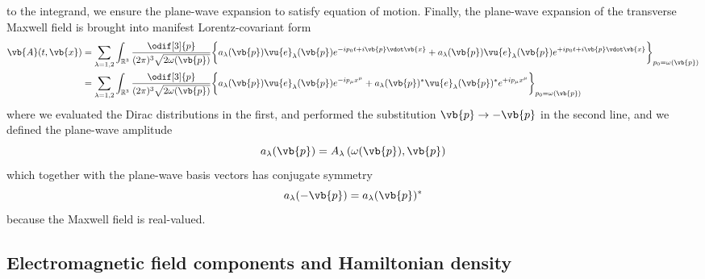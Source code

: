 to the integrand, we ensure the plane-wave expansion to satisfy equation of motion.
Finally, the plane-wave expansion of the transverse Maxwell field is brought into manifest Lorentz-covariant form
\begin{equation}
	\begin{split}
		\vb{A}(t,\vb{x})
		&=
		\sum_{\lambda=1,2}
		\int_{\mathbb{R}^3}\frac{\odif[3]{p}}{(2\pi)^3\sqrt{2\omega(\vb{p})}}
		\biggl\{
			a_\lambda(\vb{p})
			\vu{e}_\lambda(\vb{p})
			e^{-ip_0t+i\vb{p}\vdot\vb{x}}
			+
			a_\lambda(\vb{p})
			\vu{e}_\lambda(\vb{p})
			e^{+ip_0t+i\vb{p}\vdot\vb{x}}
		\biggr\}_{p_0=\omega(\vb{p})}
		\\
		&=
		\sum_{\lambda=1,2}
		\int_{\mathbb{R}^3}\frac{\odif[3]{p}}{(2\pi)^3\sqrt{2\omega(\vb{p})}}
		\biggl\{
			a_\lambda(\vb{p})
			\vu{e}_\lambda(\vb{p})
			e^{-ip_\mu x^\mu}
			+
			a_\lambda(\vb{p})^*
			\vu{e}_\lambda(\vb{p})^*
			e^{+ip_\mu x^\mu}
		\biggr\}_{p_0=\omega(\vb{p})}
	\end{split}
\end{equation}
where we evaluated the Dirac distributions in the first, and performed the substitution $\vb{p}\to-\vb{p}$ in the second line, and we defined the plane-wave amplitude
\begin{equation}
	a_\lambda(\vb{p})
	=
	A_\lambda\left(\omega(\vb{p}),\vb{p}\right)
\end{equation}
which together with the plane-wave basis vectors has conjugate symmetry
\begin{equation}
	a_\lambda(-\vb{p})
	=
	a_\lambda(\vb{p})^*	
\end{equation}
because the Maxwell field is real-valued.

\subsection{Electromagnetic field components and Hamiltonian density}

